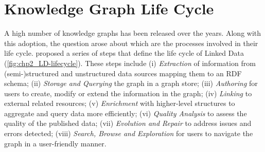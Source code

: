 \section{Knowledge Graph Life Cycle }
\label{sec:chp2_kg_lifecycle}





A high number of knowledge graphs has been released over the years. Along with this adoption, the question arose about which are the processes involved in their life cycle.
\cite{ngomo2014LD-lifecycle} proposed a series of steps that define the life cycle of Linked Data (\cref{fig:chp2_LD-lifecycle}). 
These steps include 
(i) \textit{Extraction} of information from (semi-)structured and unstructured data sources mapping them to an RDF schema; 
(ii) \textit{Storage and Querying} the graph in a graph store; 
(iii) \textit{Authoring} for users to create, modify or extend the information in the graph;
(iv) \textit{Linking} to external related resources;
(v) \textit{Enrichment} with higher-level structures to aggregate and query data more efficiently;
(vi) \textit{Quality Analysis} to assess the quality of the published data;
(vii) \textit{Evolution and Repair} to address issues and errors detected;
(viii) \textit{Search, Browse and Exploration} for users to navigate the graph in a user-friendly manner. 

